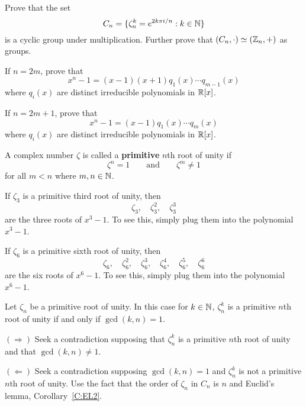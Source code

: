 \documentclass{ximera}
\begin{document}
\begin{exercise}\label{E:KN} Prove that the set 
\[
C_n = \{\zeta_n^k = e^{2k\pi i/n}: k\in \mathbb N\}
\]
is a cyclic group under multiplication. Further prove that
$(C_n,\cdot) \simeq (\mathbb Z_n,+)$ as groups.
\end{exercise}



\begin{exercise}
If $n = 2m$, prove that 
\[
x^n -1 = (x-1)(x+1)q_1(x) \cdots q_{m-1}(x)
\]
where $q_i(x)$ are distinct irreducible polynomials in $\mathbb R[x]$. 
\end{exercise}

\begin{exercise}
If $n = 2m+1$, prove that 
\[
x^n -1 = (x-1)q_1(x) \cdots q_{m}(x)
\]
where $q_i(x)$ are distinct irreducible polynomials in $\mathbb R[x]$. 
\end{exercise}


\begin{definition} 
  A complex number $\zeta$ is called a \textbf{primitive} $n$th root
  of unity if
  \[
  \zeta^n = 1 \qquad\text{and}\qquad \zeta^{m} \ne 1
  \]
  for all $m< n$ where $m,n\in\mathbb N$.
\end{definition}


\begin{example}
  If $\zeta_3$ is a primitive third root of unity, then
  \[
  \zeta_3,\quad\zeta_3^2,\quad\zeta_3^3
  \]
  are the three roots of $x^3 -1$. To see this, simply plug them into
  the polynomial $x^3-1$.
\end{example}

\begin{example}
  If $\zeta_6$ is a primitive sixth root of unity, then
  \[
  \zeta_6,\quad\zeta_6^2,\quad\zeta_6^3,\quad\zeta_6^4,\quad\zeta_6^5,\quad\zeta_6^6
  \]
  are the six roots of $x^6 -1$. To see this, simply plug them into
  the polynomial $x^6-1$.
\end{example}



\begin{theorem} 
Let $\zeta_n$ be a primitive root of unity. In this case for $k\in\mathbb N$,
$\zeta_n^k$ is a primitive $n$th root of unity if and only if
$\gcd(k,n) = 1$.

\begin{sketch} 
$(\Rightarrow)$ Seek a contradiction supposing that $\zeta_n^k$ is a
  primitive $n$th root of unity and that $\gcd(k,n) \ne 1$.

$(\Leftarrow)$ Seek a contradiction supposing $\gcd(k,n) = 1$ and
  $\zeta_n^k$ is not a primitive $n$th root of unity. Use the fact
  that the order of $\zeta_n$ in $C_n$ is $n$ and Euclid's lemma,
  Corollary~\ref{C:EL2}.
\end{sketch}
\end{theorem}
\end{document}
